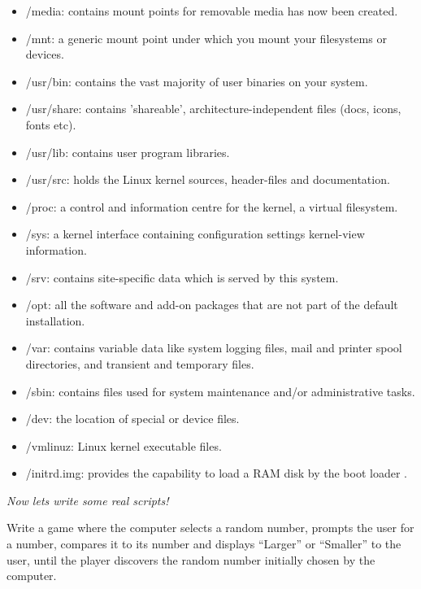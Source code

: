 \documentclass[a4paper]{article}
\begin{document}
\begin{itemize}
\begin{itemize}
        \item /media: contains mount points for removable media has now been created.
        \item /mnt:  a generic mount point under which you mount your filesystems or devices.
        \item /usr/bin: contains the vast majority of user binaries on your system.
        \item /usr/share: contains 'shareable', architecture-independent files (docs, icons, fonts etc).
        \item /usr/lib: contains user program libraries.
        \item /usr/src: holds the Linux kernel sources, header-files and documentation.
        \item /proc: a control and information centre for the kernel, a virtual filesystem.
        \item /sys: a kernel interface containing configuration settings kernel-view information.
        \item /srv: contains site-specific data which is served by this system.
        \item /opt: all the software and add-on packages that are not part of the default installation.
        \item /var: contains variable data like system logging files, mail and printer spool directories, and transient and temporary files.
        \item /sbin: contains files used for system maintenance and/or administrative tasks.
        \item /dev: the location of special or device files.
        \item /vmlinuz: Linux kernel executable files.
        \item /initrd.img: provides the capability to load a RAM disk by the boot loader \cite{linuxfilehier}.
    \end{itemize}
\end{itemize}
\begin{center}
    \textit{Now lets write some real scripts!}
\end{center}
Write a game where the computer selects a random number, prompts the user for a number, compares it to its number and displays “Larger” or “Smaller” to the user, until the player discovers the random number initially chosen by the computer.
\inputminted[frame=single,bgcolor=bg,breaklines,linenos]{bash}{l1.sh}
\printbibliography
\end{document}
